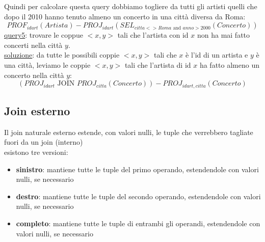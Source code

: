 Quindi per calcolare questa query dobbiamo togliere da tutti gli artisti quelli che dopo il 2010 hanno tenuto almeno un concerto in una città diversa da Roma:\\
$$PROF_{idart}(Artista)-PROJ_{idart}(SEL_{citta<>Roma \text{ and } anno>2000}(Concerto))$$
\underline{query5}: trovare le coppue $<x,y>$ tali che l'artista con id $x$ non ha mai fatto concerti nella città $y$.\\
\underline{soluzione}: da tutte le possibili coppie $<x,y>$ tali che $x$ è l'id di un artista e $y$ è una città, leviamo le coppie $<x,y>$ tali che l'artista di id $x$ ha fatto almeno un concerto nella città $y$:\\
$$(PROJ_{idart} \text{ JOIN }PROJ_{citta}(Concerto))-PROJ_{idart,citta}(Concerto)$$

\subsection{Join esterno}
Il join naturale esterno estende, con valori nulli, le tuple che verrebbero tagliate fuori da un join (interno)\\
esistono tre versioni:
\begin{itemize}
    \item \textbf{sinistro}: mantiene tutte le tuple del primo operando, estendendole con valori nulli, se necessario
    \item \textbf{destro}: mantiene tutte le tuple del secondo operando, estendendole con valori nulli, se necessario
    \item \textbf{completo}: mantiene tutte le tuple di entrambi gli operandi, estendendole con valori nulli, se necessario
\end{itemize}

